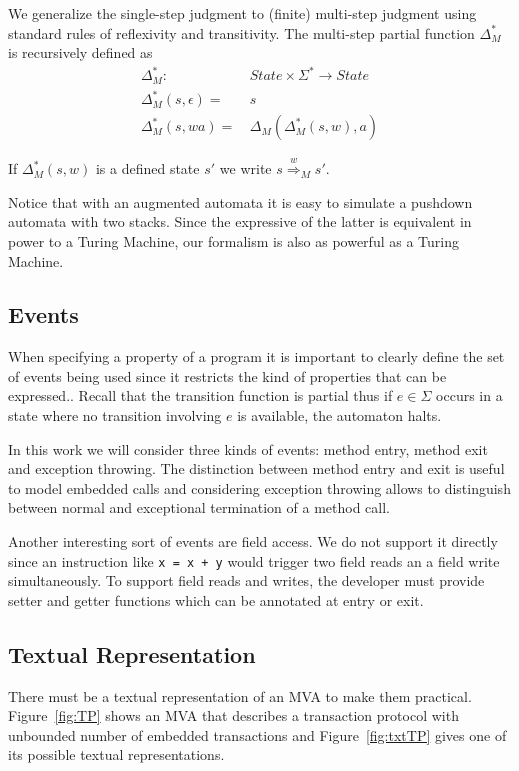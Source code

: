 \documentclass[a4paper,10pt]{article}
\def\fun{\rightarrow}
\theoremstyle{definition}
\begin{document}
We generalize the single-step judgment to (finite) multi-step judgment using standard rules of reflexivity and
transitivity. The multi-step partial function $\Delta^*_M$ is recursively defined as
\begin{align*}
\Delta^*_M \colon& State \times \Sigma^* \fun State\\
\Delta^*_M(s, \epsilon) =\,& s\\%
\Delta^*_M(s, wa) =\,& \Delta_M(\Delta^*_M(s, w), a)
\end{align*}

If $\Delta^*_M(s, w)$ is a defined state $s'$ we write $s \stackrel{w}{\Longrightarrow}_M s'$.

Notice that with an augmented automata it is easy to simulate a pushdown automata with two stacks. Since the
expressive of the latter is equivalent in power to a Turing Machine, our formalism is also as powerful as a
Turing Machine.

\subsection*{Events}
When specifying a property of a program it is important to clearly define the set of events being used since
it restricts the kind of properties that can be expressed.. Recall that the transition function is partial
thus if $e \in \Sigma$ occurs in a state where no transition involving $e$ is available, the automaton halts.

In this work we will consider three kinds of events: method entry, method exit and exception throwing. The
distinction between method entry and exit is useful to model embedded calls and considering exception throwing
allows to distinguish between normal and exceptional termination of a method call.

Another interesting sort of events are field access. We do not support it directly since an instruction like
\texttt{x = x + y} would trigger two field reads an a field write simultaneously. To support field reads and
writes, the developer must provide setter and getter functions which can be annotated at entry or exit.

\subsection*{Textual Representation}
There must be a textual representation of an MVA to make them practical. Figure~\ref{fig:TP} shows an MVA that
describes a transaction protocol with unbounded number of embedded transactions and Figure~\ref{fig:txtTP}
gives one of its possible textual representations.
\end{document}
